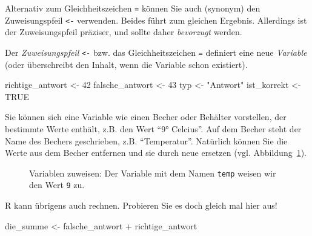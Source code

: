 \documentclass[
  letterpaper,
  oneside,
  open=any]{scrbook}
\newenvironment{Shaded}{\begin{snugshade}}{\end{snugshade}}
\newcommand{\ConstantTok}[1]{\textcolor[rgb]{0.56,0.35,0.01}{#1}}
\newcommand{\DecValTok}[1]{\textcolor[rgb]{0.68,0.00,0.00}{#1}}
\newcommand{\NormalTok}[1]{\textcolor[rgb]{0.00,0.23,0.31}{#1}}
\newcommand{\OtherTok}[1]{\textcolor[rgb]{0.00,0.23,0.31}{#1}}
\newcommand{\SpecialCharTok}[1]{\textcolor[rgb]{0.37,0.37,0.37}{#1}}
\newcommand{\StringTok}[1]{\textcolor[rgb]{0.13,0.47,0.30}{#1}}
\theoremstyle{definition}
\theoremstyle{definition}
\theoremstyle{definition}
\theoremstyle{remark}
\begin{document}
Alternativ zum Gleichheitszeichen \texttt{=} können Sie auch (synonym)
den Zuweisungspfeil \texttt{\textless{}-} verwenden. Beides führt zum
gleichen Ergebnis. Allerdings ist der Zuweisungspfeil präziser, und
sollte daher \emph{bevorzugt} werden.

Der \emph{Zuweisungspfeil} \texttt{\textless{}-} bzw. das
Gleichheitszeichen \texttt{=} definiert eine neue \emph{Variable} (oder
überschreibt den Inhalt, wenn die Variable schon existiert).

\begin{Shaded}
\begin{Highlighting}[]
\NormalTok{richtige\_antwort }\OtherTok{\textless{}{-}} \DecValTok{42}
\NormalTok{falsche\_antwort }\OtherTok{\textless{}{-}} \DecValTok{43}
\NormalTok{typ }\OtherTok{\textless{}{-}} \StringTok{"Antwort"}
\NormalTok{ist\_korrekt }\OtherTok{\textless{}{-}} \ConstantTok{TRUE}
\end{Highlighting}
\end{Shaded}

Sie können sich eine Variable wie einen Becher oder Behälter vorstellen,
der bestimmte Werte enthält, z.B. den Wert \enquote{9° Celcius}. Auf dem
Becher steht der Name des Bechers geschrieben, z.B.
\enquote{Temperatur}. Natürlich können Sie die Werte aus dem Becher
entfernen und sie durch neue ersetzen (vgl.
Abbildung~\ref{fig-def-vars}).

\begin{figure}


\caption{\label{fig-def-vars}Variablen zuweisen: Der Variable mit dem
Namen \texttt{temp} weisen wir den Wert \texttt{9} zu.}

\end{figure}%

R kann übrigens auch rechnen. Probieren Sie es doch gleich mal hier aus!

\begin{Shaded}
\begin{Highlighting}[]
\NormalTok{die\_summe }\OtherTok{\textless{}{-}}\NormalTok{ falsche\_antwort }\SpecialCharTok{+}\NormalTok{ richtige\_antwort}
\end{Highlighting}
\end{Shaded}
\end{document}
